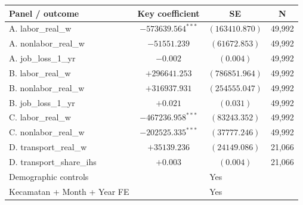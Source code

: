 \begin{tabular}{lccc}
\toprule
Panel / outcome & Key coefficient & SE & N \\
\midrule
A. labor_real_w & $-573639.564^{***}$ & $(163410.870)$ & 49,992 \\
A. nonlabor_real_w & $-51551.239$ & $(61672.853)$ & 49,992 \\
A. job_loss_1_yr & $-0.002$ & $(0.004)$ & 49,992 \\
B. labor_real_w & $+296641.253$ & $(786851.964)$ & 49,992 \\
B. nonlabor_real_w & $+316937.931$ & $(254555.047)$ & 49,992 \\
B. job_loss_1_yr & $+0.021$ & $(0.031)$ & 49,992 \\
C. labor_real_w & $-467236.958^{***}$ & $(83243.352)$ & 49,992 \\
C. nonlabor_real_w & $-202525.335^{***}$ & $(37777.246)$ & 49,992 \\
D. transport_real_w & $+35139.236$ & $(24149.086)$ & 21,066 \\
D. transport_share_ihs & $+0.003$ & $(0.004)$ & 21,066 \\
\midrule
Demographic controls & \multicolumn{3}{c}{Yes} \\
Kecamatan + Month + Year FE & \multicolumn{3}{c}{Yes} \\
\bottomrule
\end{tabular}
